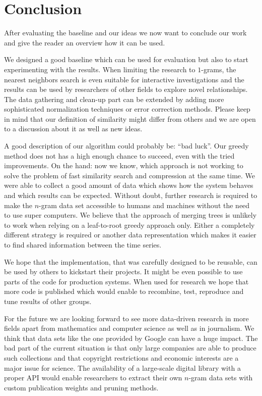 \chapter{Conclusion}
\label{ch:Conclusion}

After evaluating the baseline and our ideas we now want to conclude our work and give the reader an overview how it can be used.

We designed a good baseline which can be used for evaluation but also to start experimenting with the results. When limiting the research to $1$-grams, the nearest neighbors search is even suitable for interactive investigations and the results can be used by researchers of other fields to explore novel relationships. The data gathering and clean-up part can be extended by adding more sophisticated normalization techniques or error correction methods. Please keep in mind that our definition of similarity might differ from others and we are open to a discussion about it as well as new ideas.

A good description of our algorithm could probably be: \enquote{bad luck}. Our greedy method does not has a high enough chance to succeed, even with the tried improvements. On the hand: now we know, which approach is not working to solve the problem of fast similarity search and compression at the same time. We were able to collect a good amount of data which shows how the system behaves and which results can be expected. Without doubt, further research is required to make the $n$-gram data set accessible to humans and machines without the need to use super computers. We believe that the approach of merging trees is unlikely to work when relying on a leaf-to-root greedy approach only. Either a completely different strategy is required or another data representation which makes it easier to find shared information between the time series.

We hope that the implementation, that was carefully designed to be reusable, can be used by others to kickstart their projects. It might be even possible to use parts of the code for production systems. When used for research we hope that more code is published which would enable to recombine, test, reproduce and tune results of other groups.

For the future we are looking forward to see more data-driven research in more fields apart from mathematics and computer science as well as in journalism. We think that data sets like the one provided by Google can have a huge impact. The bad part of the current situation is that only large companies are able to produce such collections and that copyright restrictions and economic interests are a major issue for science. The availability of a large-scale digital library with a proper API would enable researchers to extract their own $n$-gram data sets with custom publication weights and pruning methods.


